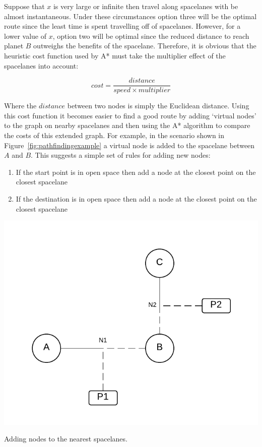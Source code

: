 Suppose that $x$ is very large or infinite then travel along spacelanes with be almost instantaneous. Under these circumstances option three will be the optimal route since the least time is spent travelling off of spacelanes. However, for a lower value of $x$, option two will be optimal since the reduced distance to reach planet $B$ outweighs the benefits of the spacelane. Therefore, it is obvious that the heuristic cost function used by A* must take the multiplier effect of the spacelanes into account:

\begin{equation*}
	cost = \frac{distance}{speed \times multiplier}
\end{equation*}

Where the $distance$ between two nodes is simply the Euclidean distance. Using this cost function it becomes easier to find a good route by adding `virtual nodes' to the graph on nearby spacelanes and then using the A* algorithm to compare the costs of this extended graph. For example, in the scenario shown in Figure~\ref{fig:pathfindingexample} a virtual node is added to the spacelane between $A$ and $B$. This suggests a simple set of rules for adding new nodes:

\begin{enumerate}
	\item If the start point is in open space then add a node at the closest point on the closest spacelane
	\item If the destination is in open space then add a node at the closest point on the closest spacelane
\end{enumerate}

\begin{marginfigure}
	\includegraphics{res/pathfinding/PathFindingSector3.pdf}
	\caption[Adding nodes to the nearest spacelanes]{Adding nodes to the nearest spacelanes.}
	\label{fig:addingnodes}
\end{marginfigure}


